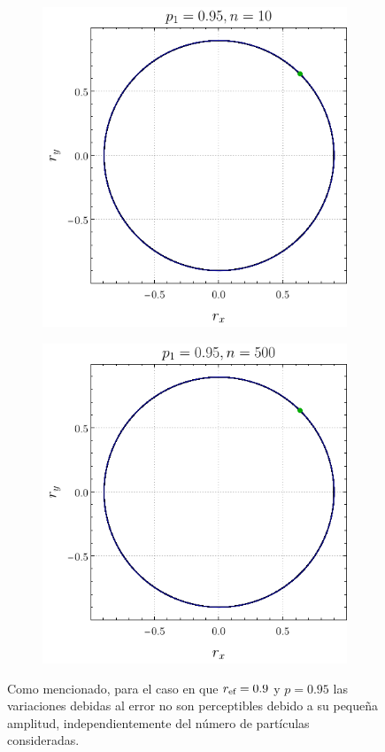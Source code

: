 \begin{figure}[ht!]
    \centering
    \begin{subfigure}{0.5\textwidth}
      \centering
      \includegraphics[width=0.9\linewidth]{chapter3/figures_separable/local_all_ran_p=0.95_r=0.9_n=10_a=-3_b=3.png}
    \end{subfigure}%
    \begin{subfigure}{0.5\textwidth}
      \centering
      \includegraphics[width=0.9\linewidth]{chapter3/figures_separable/local_all_ran_p=0.95_r=0.9_n=500_a=-3_b=3.png}
    \end{subfigure}
    \caption{Como mencionado, para el caso en que $r_{\text{ef}}=0.9$ y $p=0.95$ las variaciones debidas al error no son perceptibles debido a su pequeña amplitud, independientemente del número de partículas consideradas. }\label{fig:Oscilations12}
\end{figure}
